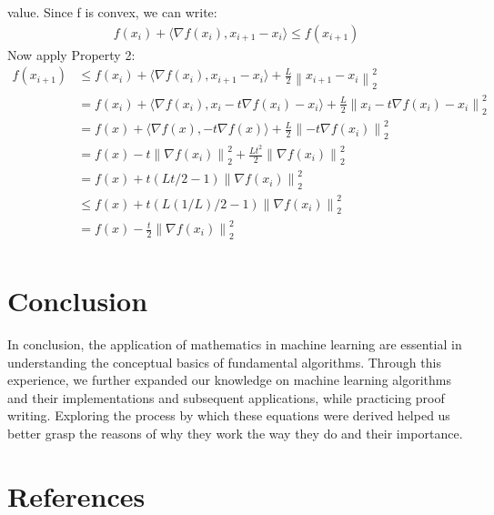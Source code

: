 \documentclass{article}
\newcommand{\norm}[1]{\left\lVert#1\right\rVert}
\begin{document}
\begin{enumerate}
value. Since f is convex, we can write: 
    \begin{equation}
    \begin{split}
    f(x_{i}) + 	\langle\nabla f(x_{i}), x_{i+1}-x_{i}\rangle \leq f(x_{i+1}) 
    \end{split}
    \end{equation}
    \newline Now apply Property 2: 
    \begin{equation}
    \begin{split}
    f(x_{i+1}) & \leq  f(x_{i}) + \langle\nabla f(x_{i}), x_{i+1}-x_{i}\rangle + \frac{L}{2}\norm{x_{i+1}-x_{i}}_2^2 \\
    & = f(x_{i}) + \langle\nabla f(x_{i}), x_{i} - t\nabla f(x_{i})-x_{i}\rangle + \frac{L}{2}\norm{x_{i} - t\nabla f(x_{i})-x_{i}}_2^2 \\
    & = f(x) + \langle\nabla f(x), -t\nabla f(x)\rangle + \frac{L}{2}\norm{- t\nabla f(x_{i})}_2^2 \\
    & = f(x) - t\norm{\nabla f(x_{i})}_2^2 +  \frac{Lt^2}{2}\norm{\nabla f(x_{i})}_2^2 \\
    & = f(x) + t(Lt/2 - 1)\norm{\nabla f(x_{i})}_2^2 \\
    & \leq f(x) + t(L(1/L)/2 - 1)\norm{\nabla f(x_{i})}_2^2 \\
    & = f(x) - \frac{t}{2}\norm{\nabla f(x_{i})}_2^2 \\
    \end{split}
    \end{equation}
\end{enumerate}
\section{Conclusion}
In conclusion, the application of mathematics in machine learning are essential in understanding the conceptual basics of fundamental algorithms. Through this experience, we further expanded our knowledge on machine learning algorithms and their implementations and subsequent applications, while practicing proof writing. Exploring the process by which these equations were derived helped us better grasp the reasons of why they work the way they do and their importance. 
\section{References}
\end{document}
